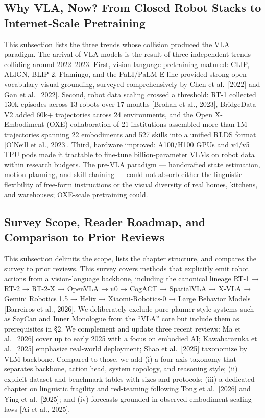 \subsection{Why VLA, Now? From Closed Robot Stacks to Internet-Scale Pretraining}\label{why-vla-now-from-closed-robot-stacks-to-internet-scale-pretraining}

This subsection lists the three trends whose collision produced the VLA paradigm. The arrival of VLA models is the result of three independent trends colliding around 2022--2023. First, vision-language pretraining matured: CLIP, ALIGN, BLIP-2, Flamingo, and the PaLI/PaLM-E line provided strong open-vocabulary visual grounding, surveyed comprehensively by Chen et al.~{[}2022{]} and Gan et al.~{[}2022{]}. Second, robot data scaling crossed a threshold: RT-1 collected 130k episodes across 13 robots over 17 months {[}Brohan et al., 2023{]}, BridgeData V2 added 60k+ trajectories across 24 environments, and the Open X-Embodiment (OXE) collaboration of 21 institutions assembled more than 1M trajectories spanning 22 embodiments and 527 skills into a unified RLDS format {[}O'Neill et al., 2023{]}. Third, hardware improved: A100/H100 GPUs and v4/v5 TPU pods made it tractable to fine-tune billion-parameter VLMs on robot data within research budgets. The pre-VLA paradigm --- handcrafted state estimation, motion planning, and skill chaining --- could not absorb either the linguistic flexibility of free-form instructions or the visual diversity of real homes, kitchens, and warehouses; OXE-scale pretraining could.

\subsection{Survey Scope, Reader Roadmap, and Comparison to Prior Reviews}\label{survey-scope-reader-roadmap-and-comparison-to-prior-reviews}

This subsection delimits the scope, lists the chapter structure, and compares the survey to prior reviews. This survey covers methods that explicitly emit robot actions from a vision-language backbone, including the canonical lineage RT-1 → RT-2 → RT-2-X → OpenVLA → π0 → CogACT → SpatialVLA → X-VLA → Gemini Robotics 1.5 → Helix → Xiaomi-Robotics-0 → Large Behavior Models {[}Barreiros et al., 2026{]}. We deliberately exclude pure planner-style systems such as SayCan and Inner Monologue from the ``VLA'' core but include them as prerequisites in §2. We complement and update three recent reviews: Ma et al.~{[}2026{]} cover up to early 2025 with a focus on embodied AI; Kawaharazuka et al.~{[}2025{]} emphasize real-world deployment; Shao et al.~{[}2025{]} taxonomize by VLM backbone. Compared to those, we add (i) a four-axis taxonomy that separates backbone, action head, system topology, and reasoning style; (ii) explicit dataset and benchmark tables with sizes and protocols; (iii) a dedicated chapter on linguistic fragility and red-teaming following Tong et al.~{[}2026{]} and Ying et al.~{[}2025{]}; and (iv) forecasts grounded in observed embodiment scaling laws {[}Ai et al., 2025{]}.

